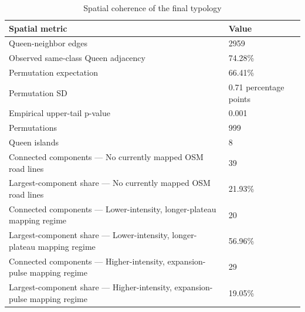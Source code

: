 \begin{table}
\caption{Spatial coherence of the final typology}
\label{tab:table_04_spatial_coherence_summary}
\begin{tabular}{ll}
\toprule
Spatial metric & Value \\
\midrule
Queen-neighbor edges & 2959 \\
Observed same-class Queen adjacency & 74.28\% \\
Permutation expectation & 66.41\% \\
Permutation SD & 0.71 percentage points \\
Empirical upper-tail p-value & 0.001 \\
Permutations & 999 \\
Queen islands & 8 \\
Connected components — No currently mapped OSM road lines & 39 \\
Largest-component share — No currently mapped OSM road lines & 21.93\% \\
Connected components — Lower-intensity, longer-plateau mapping regime & 20 \\
Largest-component share — Lower-intensity, longer-plateau mapping regime & 56.96\% \\
Connected components — Higher-intensity, expansion-pulse mapping regime & 29 \\
Largest-component share — Higher-intensity, expansion-pulse mapping regime & 19.05\% \\
\bottomrule
\end{tabular}
\end{table}


